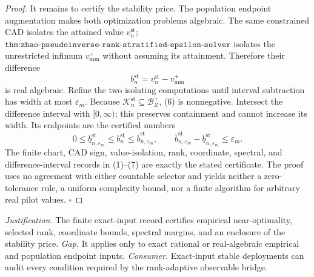 \documentclass{article}
\begin{document}
\begin{proof}
It remains to certify the stability price.  The population endpoint augmentation makes both optimization problems algebraic.  The same constrained CAD isolates the attained value \(v_n^{\mathrm{st}}\); \(\texttt{thm:zhao-pseudoinverse-rank-stratified-epsilon-solver}\) isolates the unrestricted infimum \(v_{\mathrm{mm}}^+\) without assuming its attainment.  Therefore their difference
\[
b_n^{\mathrm{st}}=v_n^{\mathrm{st}}-v_{\mathrm{mm}}^+
\tag{6}
\]
is real algebraic.  Refine the two isolating computations until interval subtraction has width at most \(\varepsilon_m\).  Because \(\mathcal K_n^{\mathrm{st}}\subseteq\mathcal B_Z^+\), (6) is nonnegative.  Intersect the difference interval with \([0,\infty)\); this preserves containment and cannot increase its width.  Its endpoints are the certified numbers
\[
0\le\underline b_{n,\varepsilon_m}^{\mathrm{st}}
\le b_n^{\mathrm{st}}
\le\overline b_{n,\varepsilon_m}^{\mathrm{st}},
\qquad
\overline b_{n,\varepsilon_m}^{\mathrm{st}}
-\underline b_{n,\varepsilon_m}^{\mathrm{st}}\le\varepsilon_m.
\tag{7}
\]
The finite chart, CAD sign, value-isolation, rank, coordinate, spectral, and difference-interval records in (1)--(7) are exactly the stated certificate.  The proof uses no agreement with either countable selector and yields neither a zero-tolerance rule, a uniform complexity bound, nor a finite algorithm for arbitrary real pilot values. \(\square\)
\end{proof}
\par\smallskip\noindent \textit{Justification.} The finite exact-input record certifies empirical near-optimality, selected rank, coordinate bounds, spectral margins, and an enclosure of the stability price. \textit{Gap.} It applies only to exact rational or real-algebraic empirical and population endpoint inputs. \textit{Consumer.} Exact-input stable deployments can audit every condition required by the rank-adaptive observable bridge.
\end{document}
